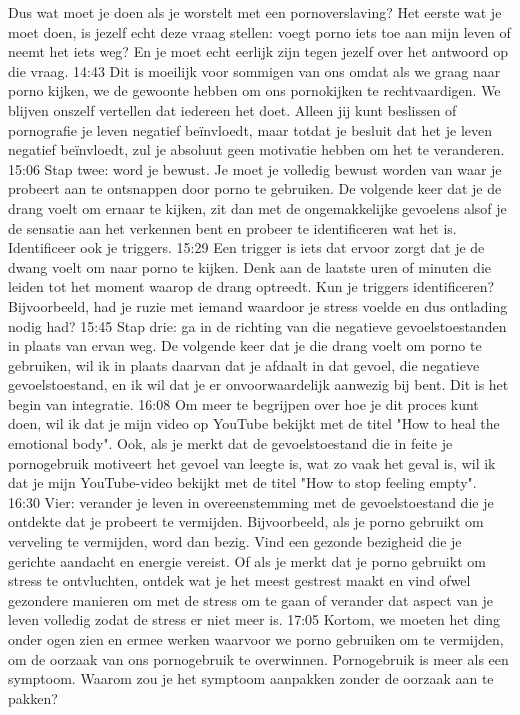 Dus wat moet je doen als je worstelt met een pornoverslaving? Het eerste wat je moet doen, is jezelf echt deze vraag stellen: voegt porno iets toe aan mijn leven of neemt het iets weg? En je moet echt eerlijk zijn tegen jezelf over het antwoord op die vraag.
14:43
Dit is moeilijk voor sommigen van ons omdat als we graag naar porno kijken, we de gewoonte hebben om ons pornokijken te rechtvaardigen. We blijven onszelf vertellen dat iedereen het doet. Alleen jij kunt beslissen of pornografie je leven negatief beïnvloedt, maar totdat je besluit dat het je leven negatief beïnvloedt, zul je absoluut geen motivatie hebben om het te veranderen.
15:06
Stap twee: word je bewust. Je moet je volledig bewust worden van waar je probeert aan te ontsnappen door porno te gebruiken. De volgende keer dat je de drang voelt om ernaar te kijken, zit dan met de ongemakkelijke gevoelens alsof je de sensatie aan het verkennen bent en probeer te identificeren wat het is. Identificeer ook je triggers.
15:29
Een trigger is iets dat ervoor zorgt dat je de dwang voelt om naar porno te kijken. Denk aan de laatste uren of minuten die leiden tot het moment waarop de drang optreedt. Kun je triggers identificeren? Bijvoorbeeld, had je ruzie met iemand waardoor je stress voelde en dus ontlading nodig had?
15:45
Stap drie: ga in de richting van die negatieve gevoelstoestanden in plaats van ervan weg. De volgende keer dat je die drang voelt om porno te gebruiken, wil ik in plaats daarvan dat je afdaalt in dat gevoel, die negatieve gevoelstoestand, en ik wil dat je er onvoorwaardelijk aanwezig bij bent. Dit is het begin van integratie.
16:08
Om meer te begrijpen over hoe je dit proces kunt doen, wil ik dat je mijn video op YouTube bekijkt met de titel "How to heal the emotional body". Ook, als je merkt dat de gevoelstoestand die in feite je pornogebruik motiveert het gevoel van leegte is, wat zo vaak het geval is, wil ik dat je mijn YouTube-video bekijkt met de titel "How to stop feeling empty".
16:30
Vier: verander je leven in overeenstemming met de gevoelstoestand die je ontdekte dat je probeert te vermijden. Bijvoorbeeld, als je porno gebruikt om verveling te vermijden, word dan bezig. Vind een gezonde bezigheid die je gerichte aandacht en energie vereist. Of als je merkt dat je porno gebruikt om stress te ontvluchten, ontdek wat je het meest gestrest maakt en vind ofwel gezondere manieren om met de stress om te gaan of verander dat aspect van je leven volledig zodat de stress er niet meer is.
17:05
Kortom, we moeten het ding onder ogen zien en ermee werken waarvoor we porno gebruiken om te vermijden, om de oorzaak van ons pornogebruik te overwinnen. Pornogebruik is meer als een symptoom. Waarom zou je het symptoom aanpakken zonder de oorzaak aan te pakken?
